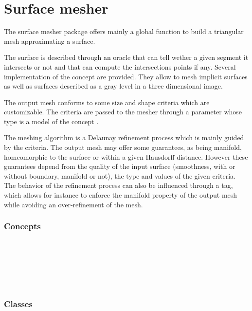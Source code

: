 \chapter{Surface mesher}


The surface mesher package offers mainly a global function
to build a triangular mesh approximating a surface.

The surface is described through an oracle that can tell wether a
given segment it intersects or not and that can compute the
intersections points if any. Several implementation of
the  concept are provided. They allow to mesh
implicit surfaces as well as  surfaces described as a gray level in a three
dimensional image.

The output mesh conforms to some size and shape criteria 
which are customizable. The criteria are passed to the mesher
through a parameter 
whose type is a model of the
concept .

The meshing algorithm is a Delaunay refinement process
which is mainly guided by the criteria. 
The output mesh may offer some guarantees, as being manifold,
homeomorphic to the surface or within a given
Hausdorff distance.  However these guarantees depend 
from the quality of the input surface (smoothness, with or without
boundary, manifold or  not),
the type and values of the given criteria. 
The behavior of the refinement process can also be influenced through
a tag, which allows for instance to enforce the manifold property
of  the output mesh  while avoiding an over-refinement of the mesh.


\subsection*{Concepts}

\\
 \\
 \\
 \\
 \\


\subsection*{Classes}
 \\
 \\
 \\
 \\

